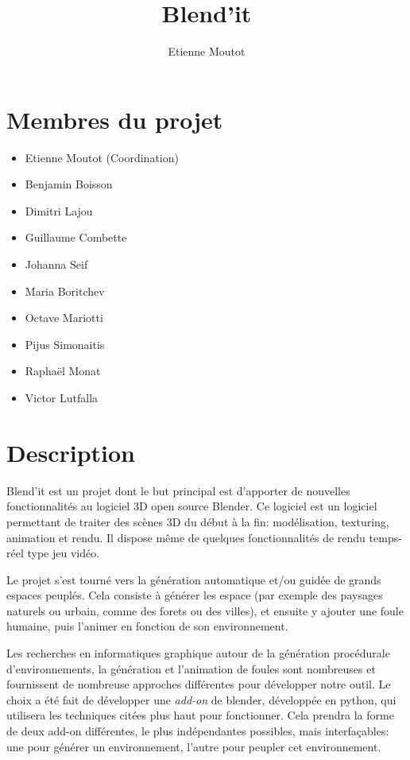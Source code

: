 \documentclass[a4paper,12pt]{article}
\title{Blend'it}
\author{Etienne Moutot}
\begin{document}
\maketitle

\section{Membres du projet}
  \begin{itemize}
    \item Etienne Moutot (Coordination)
    \item Benjamin Boisson
    \item Dimitri Lajou
    \item Guillaume Combette
    \item Johanna Seif
    \item Maria Boritchev
    \item Octave Mariotti
    \item Pijus Simonaitis
    \item Raphaël Monat
    \item Victor Lutfalla
  \end{itemize}

\section{Description}
Blend'it est un projet dont le but principal est d'apporter de nouvelles fonctionnalités au logiciel 3D open source Blender. Ce logiciel est un logiciel permettant de traiter des scènes 3D du début à la fin: modélisation, texturing, animation et rendu. Il dispose même de quelques fonctionnalités de rendu temps-réel type jeu vidéo.

Le projet s'est tourné vers la génération automatique et/ou guidée de grands espaces peuplés. Cela consiste à générer les espace (par exemple des paysages naturels ou urbain, comme des forets ou des villes), et ensuite y ajouter une foule humaine, puis l'animer en fonction de son environnement.

Les recherches en informatiques graphique autour de la génération procédurale d'environnements, la génération et  l'animation de foules sont nombreuses et fournissent de nombreuse approches différentes pour développer notre outil. Le choix a été fait de développer une \textit{add-on} de blender, développée en python, qui utilisera les techniques citées plus haut pour fonctionner. Cela prendra la forme de deux add-on différentes, le plus indépendantes possibles, mais interfaçables: une pour générer un environnement, l'autre pour peupler cet environnement.
\end{document}
